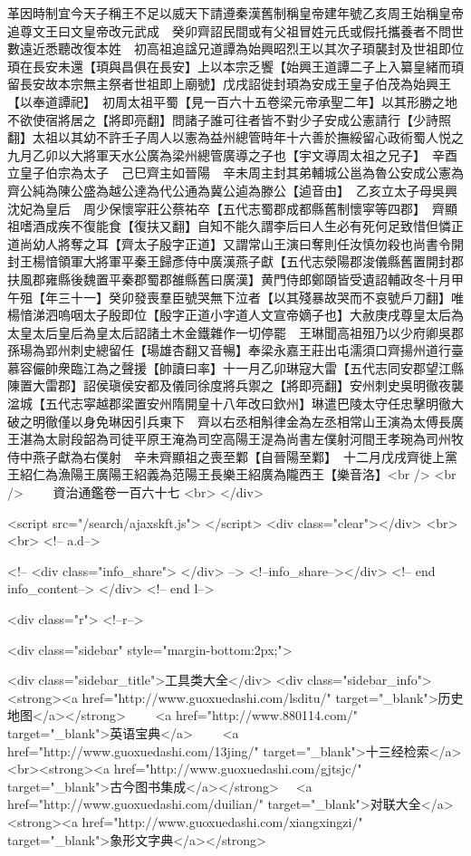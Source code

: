 革因時制宜今天子稱王不足以威天下請遵秦漢舊制稱皇帝建年號乙亥周王始稱皇帝追尊文王曰文皇帝改元武成　癸卯齊詔民間或有父祖冒姓元氏或假托攜養者不問世數遠近悉聽改復本姓　初高祖追諡兄道譚為始興昭烈王以其次子頊襲封及世祖即位頊在長安未還【頊與昌俱在長安】上以本宗乏饗【始興王道譚二子上入纂皇緒而頊留長安故本宗無主祭者世祖即上廟號】戊戌詔徙封頊為安成王皇子伯茂為始興王【以奉道譚祀】　初周太祖平蜀【見一百六十五卷梁元帝承聖二年】以其形勝之地不欲使宿將居之【將即亮翻】問諸子誰可往者皆不對少子安成公憲請行【少詩照翻】太祖以其幼不許壬子周人以憲為益州總管時年十六善於撫綏留心政術蜀人悦之九月乙卯以大將軍天水公廣為梁州總管廣導之子也【宇文導周太祖之兄子】　辛酉立皇子伯宗為太子　己巳齊主如晉陽　辛未周主封其弟輔城公邕為魯公安成公憲為齊公純為陳公盛為越公達為代公通為冀公逌為滕公【逌音由】　乙亥立太子母吳興沈妃為皇后　周少保懷寜莊公蔡祐卒【五代志蜀郡成都縣舊制懷寜等四郡】　齊顯祖嗜酒成疾不復能食【復扶又翻】自知不能久謂李后曰人生必有死何足致惜但憐正道尚幼人將奪之耳【齊太子殷字正道】又謂常山王演曰奪則任汝慎勿殺也尚書令開封王楊愔領軍大將軍平秦王歸彥侍中廣漢燕子獻【五代志滎陽郡浚儀縣舊置開封郡扶風郡雍縣後魏置平秦郡蜀郡雒縣舊曰廣漢】黄門侍郎鄭頤皆受遺詔輔政冬十月甲午殂【年三十一】癸卯發喪羣臣號哭無下泣者【以其殘暴故哭而不哀號戶刀翻】唯楊愔涕泗嗚咽太子殷即位【殷字正道小字道人文宣帝嫡子也】大赦庚戌尊皇太后為太皇太后皇后為皇太后詔諸土木金鐵雜作一切停罷　王琳聞高祖殂乃以少府卿吳郡孫瑒為郢州刺史總留任【瑒雄杏翻又音暢】奉梁永嘉王莊出屯濡須口齊揚州道行臺慕容儼帥衆臨江為之聲援【帥讀曰率】十一月乙卯琳寇大雷【五代志同安郡望江縣陳置大雷郡】詔侯瑱侯安都及儀同徐度將兵禦之【將即亮翻】安州刺史吳明徹夜襲湓城【五代志寜越郡梁置安州隋開皇十八年改曰欽州】琳遣巴陵太守任忠擊明徹大破之明徹僅以身免琳因引兵東下　齊以右丞相斛律金為左丞相常山王演為太傅長廣王湛為太尉段韶為司徒平原王淹為司空高陽王湜為尚書左僕射河間王孝琬為司州牧侍中燕子獻為右僕射　辛未齊顯祖之喪至鄴【自晉陽至鄴】　十二月戊戌齊徙上黨王紹仁為漁陽王廣陽王紹義為范陽王長樂王紹廣為隴西王【樂音洛】<br />
<br />
　　資治通鑑卷一百六十七  <br>
   </div> 

<script src="/search/ajaxskft.js"> </script>
 <div class="clear"></div>
<br>
<br>
 <!-- a.d-->

 <!--
<div class="info_share">
</div> 
-->
 <!--info_share--></div>   <!-- end info_content-->
  </div> <!-- end l-->

<div class="r">   <!--r-->



<div class="sidebar"  style="margin-bottom:2px;">

 
<div class="sidebar_title">工具类大全</div>
<div class="sidebar_info">
<strong><a href="http://www.guoxuedashi.com/lsditu/" target="_blank">历史地图</a></strong>　　
<a href="http://www.880114.com/" target="_blank">英语宝典</a>　　
<a href="http://www.guoxuedashi.com/13jing/" target="_blank">十三经检索</a>　
<br><strong><a href="http://www.guoxuedashi.com/gjtsjc/" target="_blank">古今图书集成</a></strong>　
<a href="http://www.guoxuedashi.com/duilian/" target="_blank">对联大全</a>　<strong><a href="http://www.guoxuedashi.com/xiangxingzi/" target="_blank">象形文字典</a></strong>　

